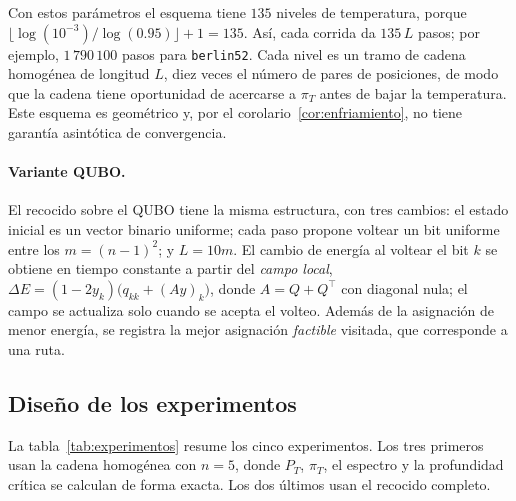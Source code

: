 Con estos parámetros el esquema tiene \(135\) niveles de temperatura,
porque \(\lfloor\log(10^{-3})/\log(0.95)\rfloor+1=135\). Así, cada
corrida da \(135\,L\) pasos; por ejemplo, \(1\,790\,100\) pasos para
\texttt{berlin52}. Cada nivel es un tramo de cadena homogénea de
longitud \(L\), diez veces el número de pares de posiciones, de modo
que la cadena tiene oportunidad de acercarse a \(\pi_T\) antes de bajar
la temperatura. Este esquema es geométrico y, por el
corolario~\ref{cor:enfriamiento}, no tiene garantía asintótica de
convergencia.

\paragraph{Variante QUBO.} El recocido sobre el QUBO tiene la misma
estructura, con tres cambios: el estado inicial es un vector binario
uniforme; cada paso propone voltear un bit uniforme entre los
\(m=(n-1)^2\); y \(L=10m\). El cambio de energía al voltear el bit
\(k\) se obtiene en tiempo constante a partir del \emph{campo local},
\(\Delta E=(1-2y_k)\bigl(q_{kk}+(Ay)_k\bigr)\), donde \(A=Q+Q^{\top}\)
con diagonal nula; el campo se actualiza solo cuando se acepta el
volteo. Además de la asignación de menor energía, se registra la mejor
asignación \emph{factible} visitada, que corresponde a una ruta.

\subsection{Diseño de los experimentos}
\label{subsec:diseno}

La tabla~\ref{tab:experimentos} resume los cinco experimentos. Los tres
primeros usan la cadena homogénea con \(n=5\), donde \(P_T\), \(\pi_T\),
el espectro y la profundidad crítica se calculan de forma exacta. Los
dos últimos usan el recocido completo.

